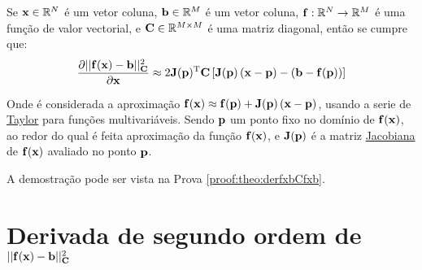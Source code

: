 \begin{theorem}\label{theo:derfxbCfxb}
Se 
$\VECTOR{x}\in \mathbb{R}^N$ é um vetor coluna, 
$\VECTOR{b}\in \mathbb{R}^M$ é um vetor coluna,  
$\VECTOR{f}: \mathbb{R}^{N}\rightarrow \mathbb{R}^{M}$ é uma função de valor vectorial, e
$\MATRIX{C} \in \mathbb{R}^{M\times M}$ é uma matriz diagonal, 
então se cumpre que:
\begin{equation}
\frac{\partial ||\VECTOR{f}(\VECTOR{x})-\VECTOR{b}||_{\MATRIX{C}}^2}{\partial \VECTOR{x}} \approx
2 \MATRIX{J}(\VECTOR{p})^{\transpose}\MATRIX{C}\left[\MATRIX{J}(\VECTOR{p})\left(\VECTOR{x} - \VECTOR{p}\right)-\left(\VECTOR{b}-\VECTOR{f}(\VECTOR{p})\right)\right]
\end{equation}

Onde é considerada a aproximação
$\VECTOR{f}(\VECTOR{x})\approx \VECTOR{f}(\VECTOR{p})+\MATRIX{J}(\VECTOR{p})\left(\VECTOR{x}-\VECTOR{p}\right)$,
usando a serie de \hyperref[def:taylor]{Taylor} \cite{Taylor} para funções multivariáveis. Sendo $\VECTOR{p}$ um ponto fixo no domínio de $\VECTOR{f}(\VECTOR{x})$,  ao redor do qual é feita  aproximação
da função $\VECTOR{f}(\VECTOR{x})$,
e $\MATRIX{J}(\VECTOR{p})$ é a matriz \hyperref[def:jacobian]{Jacobiana} \cite{Jacobian} de $\VECTOR{f}(\VECTOR{x})$ avaliado no ponto $\VECTOR{p}$.

A demostração pode ser vista na Prova \ref{proof:theo:derfxbCfxb}.
\end{theorem}

\section{Derivada de segundo ordem de $||\VECTOR{f}(\VECTOR{x})-\VECTOR{b}||_{\MATRIX{C}}^2$ 
}

